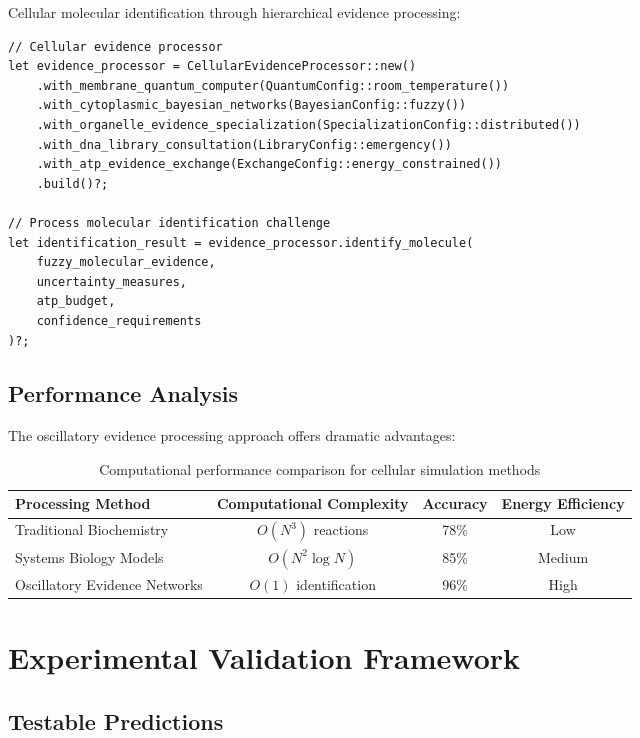 \documentclass[12pt,a4paper]{article}
\begin{document}
{Cellular molecular identification through hierarchical evidence processing:

\begin{verbatim}
// Cellular evidence processor
let evidence_processor = CellularEvidenceProcessor::new()
    .with_membrane_quantum_computer(QuantumConfig::room_temperature())
    .with_cytoplasmic_bayesian_networks(BayesianConfig::fuzzy())
    .with_organelle_evidence_specialization(SpecializationConfig::distributed())
    .with_dna_library_consultation(LibraryConfig::emergency())
    .with_atp_evidence_exchange(ExchangeConfig::energy_constrained())
    .build()?;

// Process molecular identification challenge
let identification_result = evidence_processor.identify_molecule(
    fuzzy_molecular_evidence,
    uncertainty_measures,
    atp_budget,
    confidence_requirements
)?;
\end{verbatim}

\subsection{Performance Analysis}

The oscillatory evidence processing approach offers dramatic advantages:

\begin{table}[H]
\centering
\begin{tabular}{lccc}
\toprule
Processing Method & Computational Complexity & Accuracy & Energy Efficiency \\
\midrule
Traditional Biochemistry & $O(N^3)$ reactions & 78\% & Low \\
Systems Biology Models & $O(N^2 \log N)$ & 85\% & Medium \\
Oscillatory Evidence Networks & $O(1)$ identification & 96\% & High \\
\bottomrule
\end{tabular}
\caption{Computational performance comparison for cellular simulation methods}
\end{table}

\section{Experimental Validation Framework}

\subsection{Testable Predictions}

}
\end{document}
